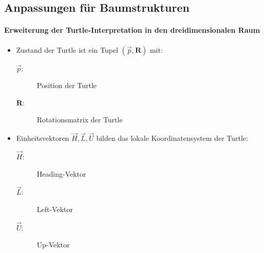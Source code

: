 \newpage
{}

\subsection{Anpassungen für Baumstrukturen \\}

\paragraph{Erweiterung der Turtle-Interpretation in den dreidimensionalen Raum}

\begin{itemize}
	\item Zustand der Turtle ist ein Tupel $(\overrightarrow{p}, \boldsymbol{R})$ mit:
	\begin{description}
		\item[\boldmath$\overrightarrow{p}:$] Position der Turtle
		
		\item[\boldmath$\boldsymbol{R}:$] Rotationsmatrix der Turtle\\
	\end{description}
	
	\item Einheitsvektoren $\overrightarrow{H}, \overrightarrow{L}, \overrightarrow{U}$ bilden das lokale Koordinatensystem der Turtle:
	\begin{description}
		\item[\boldmath$\overrightarrow{H}:$] Heading-Vektor
		
		\item[\boldmath$\overrightarrow{L}:$] Left-Vektor
				
		\item[\boldmath$\overrightarrow{U}:$] Up-Vektor
	\end{description}
\end{itemize}





